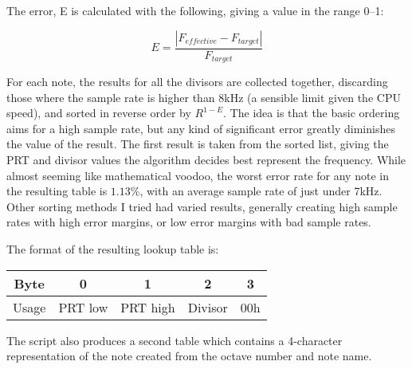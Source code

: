 The error, E is calculated with the following, giving a value in the range 0--1:

\[E = \frac{\left|F_{effective} - F_{target}\right|}{F_{target}}\]

For each note, the results for all the divisors are collected together, discarding those where the 
sample rate is higher than 8kHz (a sensible limit given the CPU speed), and sorted in reverse order 
by $R^{1-E}$.  The idea is that the basic ordering aims for a high sample rate, but any kind of 
significant error greatly diminishes the value of the result.  The first result is taken from the 
sorted list, giving the PRT and divisor values the algorithm decides best represent the frequency.  
While almost seeming like mathematical voodoo, the worst error rate for any note in the resulting 
table is $1.13\%$, with an average sample rate of just under 7kHz.  Other sorting methods I tried 
had varied results, generally creating high sample rates with high error margins, or low error 
margins with bad sample rates.

The format of the resulting lookup table is:
\begin{nowordcount}
\begin{center}
\begin{tabular}{c || c | c | c | c}
Byte & 0 & 1 & 2 & 3 \\
\hline
Usage & PRT low & PRT high & Divisor & 00h \\
\end{tabular}
\end{center}
\end{nowordcount}

The script also produces a second table which contains a 4-character representation of the note 
created from the octave number and note name.
